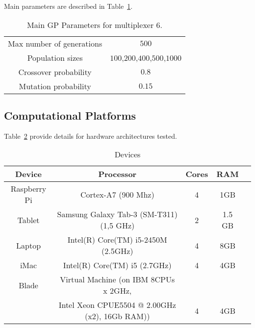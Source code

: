 
Main parameters are described in Table~\ref{Table:par_gp}.  %

\begin{table}
\centering
\caption{Main GP Parameters for multiplexer 6.}
\label{Table:par_gp}
\begin{tabular}{cc}
\hline
Max number of generations & $500$ \\
Population sizes & $100$,$200$,$400$,$500$,$1000$ \\
Crossover probability & $0.8$ \\ 
Mutation probability & $0.15$ \\ 
\hline
\end{tabular}
\end{table}


\subsection{Computational Platforms}

Table~\ref{Table:devices} provide details for hardware architectures tested. 
\begin{table}
\centering
\caption{Devices}
\label{Table:devices}
\begin{tabular}{ccccc} \hline
Device		&	Processor			&	Cores	&	RAM \\ \hline
Raspberry Pi	& Cortex-A7 (900 Mhz)	& 4 			&	1GB \\
Tablet		& Samsung Galaxy Tab-3 (SM-T311) (1,5 GHz)& 2  & 1.5 GB \\
Laptop 		& Intel(R) Core(TM) i5-2450M (2.5GHz)	&	4	&	8GB\\
iMac			& Intel(R) Core(TM) i5  (2.7GHz)	& 4	& 4GB \\
Blade		& Virtual Machine (on IBM 8CPUs x 2GHz, \\
&Intel Xeon CPUE5504 @ 2.00GHz (x2), 16Gb RAM)) & 4 & 4GB \\
\hline
\end{tabular}
\end{table}

